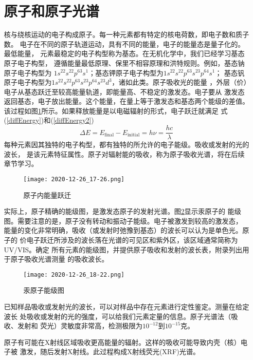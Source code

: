 \section{原子和原子光谱}
核与绕核运动的电子构成原子。每一种元素都有特定的核电荷数，即电子数和质子数。
电子在不同的原子轨道运动，具有不同的能量，电子的能量态是量子化的。最低能量，
元素最稳定的电子构型称为基态。在无机化学中，我们已经学习基态原子电子构型，
遵循能量最低原理、保里不相容原理和洪特规则。例如，基态钠原子电子构型为
$1s^22s^22p^63s^1$；基态钾原子电子构型为$1s^22s^22p^63s^23p^64s^1$；
基态钒原子电子构型为$1s^22s^22p^63s^23p^64s^23d^3$，诸如此类。原子吸收光的能量
，外层（价）电子从基态跃迁至较高能量轨道，即能量高、不稳定的激发态。电子要从
激发态返回基态，电子放出能量。这个能量，在量上等于激发态和基态两个能级的差值。
该过程如图\ref{fig:2.5}所示。如果释放能量是以电磁辐射的形式，电子跃迁就满足
式(\ref{diffEnergy})和(\ref{diffEnergy2})
\begin{equation}
    \Delta E = E_{\text{final}} - E_{\text{initial}} = h\nu =
    \frac{hc}{\lambda}
    \label{eq:2.6}
\end{equation}
每种元素因其独特的电子构型，都有独特的所允许的电子能级。吸收或发射的光的波长，
是该元素特征属性。原子对辐射能的吸收，称为原子吸收光谱，将在后续章节学习。
\begin{figure}[htpb]
    \centering
    \texttt{[image: 2020-12-26\_17-26.png]}
    \caption{原子内能量跃迁}
    \label{fig:2.5}
\end{figure}

实际上，原子精确的能级图，是激发态原子的发射光谱。图\ref{fig:2.6}显示汞原子的
能级图。需要注意的是，原子没有转动和振动子能级。电子被激发到较高的激发态，
能量的变化非常明确，吸收（或发射时弛豫到基态）的波长可以认为是单色光。原子的
价电子跃迁所涉及的波长落在光谱的可见区和紫外区，该区域通常简称为UV/VIS。确定
所有元素的能级图，并提供原子吸收和发射的波长表，附录列出用于原子吸收光谱测量
的吸收波长。
\begin{figure}[htpb]
    \centering
    \texttt{[image: 2020-12-26\_18-22.png]}
    \caption{汞原子能级图}
    \label{fig:2.6}
\end{figure}

已知样品吸收或发射光的波长，可以对样品中存在元素进行定性鉴定。测量在给定波长
处吸收或发射的光的强度，可以给我们元素定量的信息。原子光谱法（吸收、发射和
荧光）灵敏度非常高，检测极限为$10^{-12}$到$10^{-15}$克。

原子有可能在X射线区域吸收更高能量的辐射。这样的吸收可能导致内壳（核）电子被
激发，随后发射X射线。此过程构成X射线荧光(XRF)光谱。
